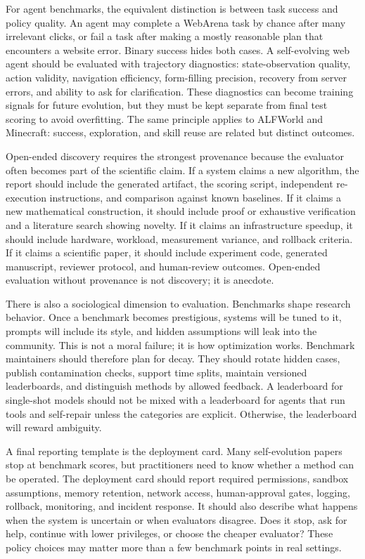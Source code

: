 For agent benchmarks, the equivalent distinction is between task success and policy quality. An agent may complete a WebArena task by chance after many irrelevant clicks, or fail a task after making a mostly reasonable plan that encounters a website error. Binary success hides both cases. A self-evolving web agent should be evaluated with trajectory diagnostics: state-observation quality, action validity, navigation efficiency, form-filling precision, recovery from server errors, and ability to ask for clarification. These diagnostics can become training signals for future evolution, but they must be kept separate from final test scoring to avoid overfitting. The same principle applies to ALFWorld and Minecraft: success, exploration, and skill reuse are related but distinct outcomes.

Open-ended discovery requires the strongest provenance because the evaluator often becomes part of the scientific claim. If a system claims a new algorithm, the report should include the generated artifact, the scoring script, independent re-execution instructions, and comparison against known baselines. If it claims a new mathematical construction, it should include proof or exhaustive verification and a literature search showing novelty. If it claims an infrastructure speedup, it should include hardware, workload, measurement variance, and rollback criteria. If it claims a scientific paper, it should include experiment code, generated manuscript, reviewer protocol, and human-review outcomes. Open-ended evaluation without provenance is not discovery; it is anecdote.

There is also a sociological dimension to evaluation. Benchmarks shape research behavior. Once a benchmark becomes prestigious, systems will be tuned to it, prompts will include its style, and hidden assumptions will leak into the community. This is not a moral failure; it is how optimization works. Benchmark maintainers should therefore plan for decay. They should rotate hidden cases, publish contamination checks, support time splits, maintain versioned leaderboards, and distinguish methods by allowed feedback. A leaderboard for single-shot models should not be mixed with a leaderboard for agents that run tools and self-repair unless the categories are explicit. Otherwise, the leaderboard will reward ambiguity.

A final reporting template is the deployment card. Many self-evolution papers stop at benchmark scores, but practitioners need to know whether a method can be operated. The deployment card should report required permissions, sandbox assumptions, memory retention, network access, human-approval gates, logging, rollback, monitoring, and incident response. It should also describe what happens when the system is uncertain or when evaluators disagree. Does it stop, ask for help, continue with lower privileges, or choose the cheaper evaluator? These policy choices may matter more than a few benchmark points in real settings.

